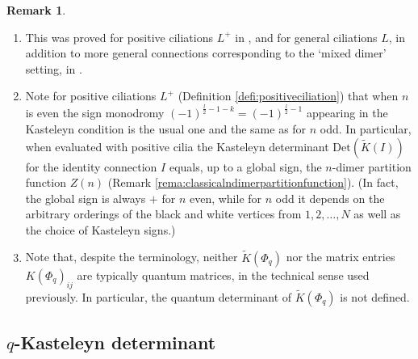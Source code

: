 \documentclass[12pt, reqno]{amsart}
\theoremstyle{definition}
\newtheorem{rema}[theo]{Remark}
\renewcommand{\tilde}{\widetilde}
\newcommand{\Det}{\mathrm{Det}}%
\begin{document}
\begin{rema}
\begin{enumerate}
\item
This was proved for positive ciliations $L^+$ in \cite{DKS}, and for general ciliations $L$, in addition to more general connections corresponding to the `mixed dimer' setting, in \cite{KenyonOvenhouse}.  
\item
Note for positive ciliations $L^+$ (Definition \ref{defi:positiveciliation}) that when $n$ is even the sign monodromy $(-1)^{\frac{l}{2}-1-k}=(-1)^{\frac{l}{2}-1}$ appearing in the Kasteleyn condition is the usual one and the same as for $n$ odd.  In particular, when evaluated with positive cilia the Kasteleyn determinant $\Det(\tilde{K}(I))$ for the identity connection $I$ equals, up to a global sign, the $n$-dimer partition function $Z(n)$ (Remark \ref{rema:classicalndimerpartitionfunction}).  (In fact, the global sign is always $+$ for $n$ even, while for $n$ odd it depends on the arbitrary orderings of the black and white vertices from $1,2,\dots,N$ as well as the choice of Kasteleyn signs.)
\item
Note that, despite the terminology, neither $\tilde{K}(\Phi_q)$ nor the matrix entries $K(\Phi_q)_{ij}$ are typically quantum matrices, in the technical sense used previously.  In particular, the quantum determinant of $\tilde{K}(\Phi_q)$ is not defined.  
\end{enumerate}
\end{rema}

\subsection{\texorpdfstring{$q$}{q}-Kasteleyn determinant}\label{ssec:qkastdet}
\end{document}
